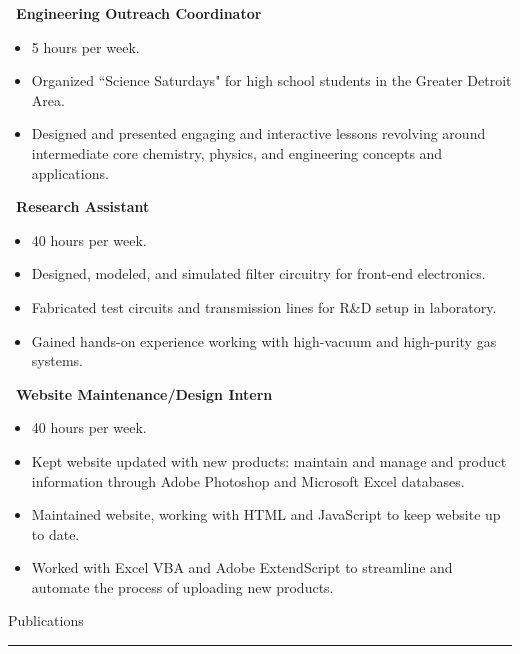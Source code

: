 \documentclass[]{article}
\begin{document}
 \newline
{\bf \ Engineering Outreach Coordinator}
\begin{itemize}[label={$\bullet$}]
	\item 5 hours per week.
	\item Organized ``Science Saturdays" for high school students in the Greater Detroit Area.
	\item Designed and presented engaging and interactive lessons revolving around intermediate core chemistry, physics, and engineering concepts and applications.
\end{itemize}

 \newline
{\bf \ Research Assistant}
\begin{itemize}[label={$\bullet$}]
	\item 40 hours per week.
	\item Designed, modeled, and simulated filter circuitry for front-end electronics. 
	\item Fabricated test circuits and transmission lines for R\&D setup in laboratory. 
	\item Gained hands-on experience working with high-vacuum and high-purity gas systems.
\end{itemize}
	
 \newline
{\bf \ Website Maintenance/Design Intern}
\begin{itemize}[label={$\bullet$}]
	\item 40 hours per week.
	\item Kept website updated with new products: maintain and manage and product information through Adobe Photoshop and Microsoft Excel databases. 
	\item Maintained website, working with HTML and JavaScript to keep website up to date. 
	\item Worked with Excel VBA and Adobe ExtendScript to streamline and automate the process of uploading new products. 
\end{itemize}

\vspace{15pt}
{\LARGE Publications}
\vspace{3pt}
\hrule
\vspace{10pt}
\end{document}
